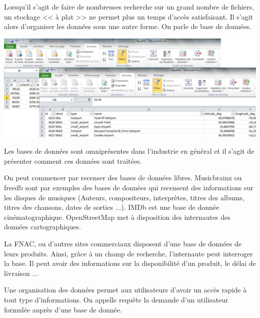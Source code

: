 \documentclass[10pt]{article}
\begin{document}
\begin{minipage}[c]{.49\linewidth}
Lorsqu'il s'agit de faire de nombreuses recherche sur un grand nombre de fichiers, un stockage << à plat >> ne permet plus un temps d'accès satisfaisant. Il s'agit alors d'organiser les données sous une autre forme. On parle de base de données. 
\end{minipage} \hfill
\begin{minipage}[c]{.49\linewidth}
\includegraphics[width=.95\textwidth]{images/BDD_aplat}
\end{minipage}

Les bases de données sont omniprésentes dans l'industrie en général et il s'agit de présenter comment ces données sont traitées. 

On peut commencer par recenser des bases de données libres. Musicbrainz ou freedb sont par exemples des bases de données qui recensent des informations sur les disques de musiques (Auteurs, compositeurs, interprètes, titres des albums, titres des chansons, dates de sorties ...). IMDb est une base de donnée cinématographique. OpenStreetMap met à disposition des internautes des données cartographiques. 

La FNAC, ou d'autres sites commerciaux disposent d'une base de données de leurs produits. Ainsi, grâce à un champ de recherche, l'internaute peut interroger la base. Il peut avoir des informations sur la disponibilité d'un produit, le délai de livraison ...

Une organisation des données permet aux utilisateurs d'avoir un accès rapide à tout type d'informations. On appelle requête la demande d'un utilisateur formulée auprès d'une base de donnée. 
\end{document}

